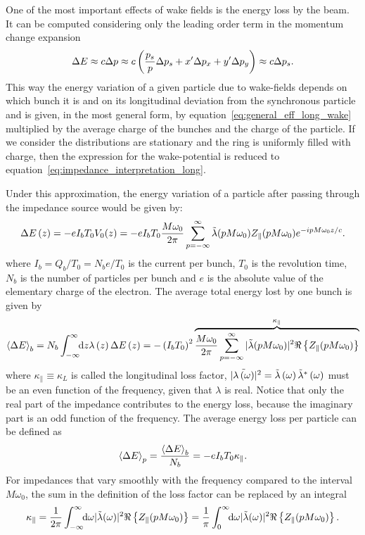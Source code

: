     One of the most important effects of wake fields is the energy loss by the beam. It can be computed considering only the leading order term in the momentum change expansion
    \begin{align}
        \Delta E \approx c\Delta p \approx c\fof{\frac{p_s}{p}\Delta p_s + x'\Delta p_x + y'\Delta p_y} \approx c\Delta p_s.
    \end{align}
    This way the energy variation of a given particle due to wake-fields depends on which bunch it is and on its longitudinal deviation from the synchronous particle and is given, in the most general form, by equation~\eqref{eq:general_eff_long_wake} multiplied by the average charge of the bunches and the charge of the particle. If we consider the distributions are stationary and the ring is uniformly filled with charge, then the expression for the wake-potential is reduced to equation~\eqref{eq:impedance_interpretation_long}.

    Under this approximation, the energy variation of a particle after passing through the impedance source would be given by:
    \begin{align}\label{eq:part_energy_loss}
	  	\Delta E\fof{z} = -eI_bT_0V_0(z) = -eI_bT_0\frac{M\omega_0}{2\pi} \sum_{p=-\infty}^\infty \fourier{\lambda}(pM\omega_0)Z_\parallel(pM\omega_0)e^{-ipM\omega_0 z/c}.
    \end{align}
    where $I_b=Q_b/T_0=N_be/T_0$ is the current per bunch, $T_0$ is the revolution time, $N_b$ is the number of particles per bunch and $e$ is the absolute value of the elementary charge of the electron. The average total energy lost by one bunch is given by
    \begin{align}\label{eq:energy_loss_bunch}
        \average[b]{\Delta E} = N_b\infint{z}{\lambda\fof{z}\Delta E\fof{z}} = -\fof{I_bT_0}^2\overbrace{\frac{M\omega_0}{2\pi} \sum_{p=-\infty}^\infty |\fourier{\lambda}(pM\omega_0)|^2\real{Z_\parallel(pM\omega_0)}}^{\kappa_\parallel}
    \end{align}
    where $\kappa_\parallel \equiv \kappa_L$ is called the longitudinal loss factor, $|\fourier{\lambda\fof{\omega}}|^2 = \fourier{\lambda}\fof{\omega}\fourier{\lambda}^*\fof{\omega}$ must be an even function of the frequency, given that $\lambda$ is real. Notice that only the real part of the impedance contributes to the energy loss, because the imaginary part is an odd function of the frequency. The average energy loss per particle can be defined as
    \begin{align}
        \average[p]{\Delta E} = \frac{\average[b]{\Delta E}}{N_b} = -eI_bT_0\kappa_\parallel.
    \end{align}
    For impedances that vary smoothly with the frequency compared to the interval $M\omega_0$, the sum in the definition of the loss factor can be replaced by an integral
    \begin{align}
        \kappa_\parallel =
            \frac{1}{2\pi} \infint{\omega}|\fourier{\lambda}(\omega)|^2\real{Z_\parallel(pM\omega_0)} =
            \frac1\pi \defint{\omega}{|\fourier{\lambda}(\omega)|^2\real{Z_\parallel(pM\omega_0)}}{0}{\infty}.
    \end{align}

